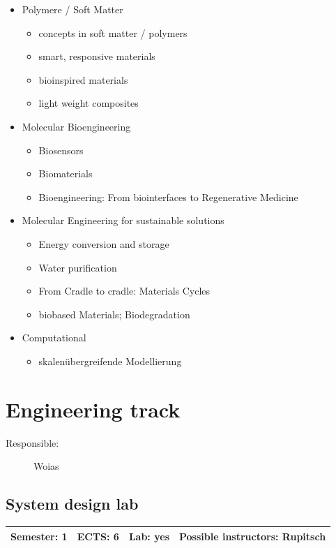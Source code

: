 \documentclass[12pt,twoside,fleqn,a4paper]{article}
\begin{document}
\begin{itemize}
\setlength\itemsep{0cm}
\item Polymere / Soft Matter
\begin{itemize}
\item concepts in soft matter / polymers
\item smart, responsive materials
\item bioinspired materials
\item light weight composites
\end{itemize}

\item Molecular Bioengineering
\begin{itemize}
\item Biosensors
\item Biomaterials
\item Bioengineering: From biointerfaces to Regenerative Medicine
\end{itemize}

\item Molecular Engineering for sustainable solutions
\begin{itemize}
\item Energy conversion and storage
\item Water purification
\item From Cradle to cradle: Materials Cycles
\item biobased Materials; Biodegradation
\end{itemize}

\item Computational
\begin{itemize}
\item skalenübergreifende Modellierung
\end{itemize}
\end{itemize}


\newpage
\section{Engineering track}
\begin{description}
\item[Responsible:] Woias
\end{description}
\vspace{1 mm}


\subsection{System design lab}
\begin{tabular}{llll} \hline
\textbf{Semester:} 1 & \textbf{ECTS:} 6 & \textbf{Lab:} yes & \textbf{Possible instructors:} Rupitsch\\
\hline
\end{tabular}
\end{document}
